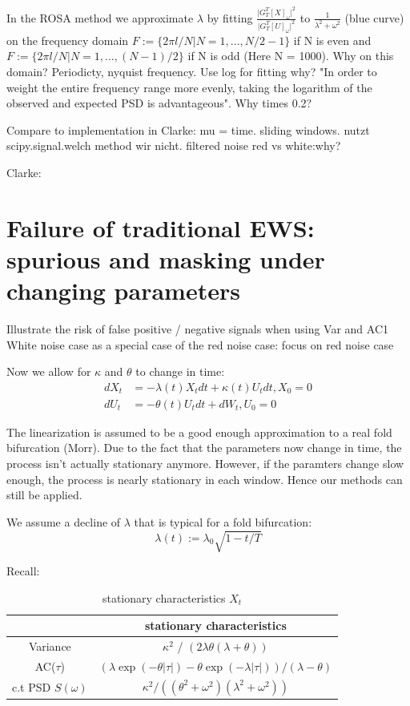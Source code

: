 \documentclass[%
thesis=student,%
coverpage=false,%
titlepage=false,%
headmarks=true, %
german,%
font=libertine, %
math=newpxtx, %
BCOR=5mm,%
coverBCOR=11mm%
]{tumbook}
\begin{document}
In the ROSA method 
we approximate $\lambda$ by fitting $\frac{\lvert G_{T}^{T}[X]_{\omega} \rvert ^2}{\lvert G_{T}^{T}[U]_{\omega} \rvert ^2}$ to $\frac{1}{\lambda ^2 + \omega ^2}$ (blue curve) on the frequency domain $F:=\{2\pi l/N | N = 1,...,N/2 - 1\}$ if N is even and $F := \{2\pi l/N | N = 1,...,(N-1)/2 \}$ if N is odd (Here N = 1000). Why on this domain? Periodicty, nyquist frequency. Use log for fitting why? "In order to weight the entire frequency range more evenly, taking the logarithm of the observed and expected PSD is advantageous". Why times 0.2?

Compare to implementation in Clarke: mu = time. sliding windows. nutzt scipy.signal.welch method wir nicht.
filtered noise red vs white:why?

Clarke:



\chapter{Failure of traditional EWS: spurious and masking under changing parameters}

Illustrate the risk of false positive / negative signals when using Var and AC1
White noise case as a special case of the red noise case: focus on red noise case

Now we allow for $\kappa$ and $\theta$ to change in time:
    \begin{subequations}
    \begin{align*}
        dX_{t} &= -\lambda(t) X_{t}dt + \kappa(t) U_{t}dt, X_{0} = 0 \\
        dU_{t} &= -\theta(t) U_{t}dt + dW_{t}, U_{0} = 0
    \end{align*}
    \end{subequations}

The linearization is assumed to be a good enough approximation to a real fold bifurcation (Morr). Due to the fact that the parameters now change in time, the process isn't actually stationary anymore. However, if the paramters change slow enough, the process is nearly stationary in each window. Hence our methods can still be applied.

We assume a decline of $\lambda$ that is typical for a fold bifurcation: 
    \[
    \lambda(t) := \lambda_{0}\sqrt{1-t/T}
    \]

Recall: 

\begin{table}[h!]
\centering
\begin{tabular}{|c|c|}
\hline
& stationary characteristics\\
\hline
Variance & $\kappa^2$ / $(2\lambda\theta(\lambda + \theta))$\\
AC($\tau$) & $(\lambda\exp(-\theta\lvert\tau\rvert)-\theta\exp(-\lambda\lvert\tau\rvert))/(\lambda - \theta)$\\
c.t PSD $S(\omega)$ & $\kappa^2/((\theta^2 + \omega^2)(\lambda^2 + \omega^2))$\\
\hline
\end{tabular}
\caption{stationary characteristics $X_{t}$}
\label{tab:simple_table}
\end{table}
\end{document}
